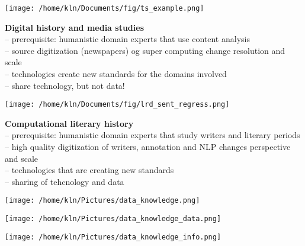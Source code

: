 \documentclass[8pt]{beamer}
\begin{document}

\begin{frame}
	\begin{center}
		\texttt{[image: /home/kln/Documents/fig/ts\_example.png]}
	\end{center}
	\small \textbf{Digital history and media studies}\\
	 -- prerequisite: humanistic domain experts that use content analysis\\
	 -- source digitization (newspapers) og super computing change resolution and scale\\
	 -- technologies create new standards for the domains involved\\
	 -- share technology, but not data!\\
\end{frame}

\begin{frame}
\begin{center}
	\texttt{[image: /home/kln/Documents/fig/lrd\_sent\_regress.png]}
\end{center}
\small \textbf{Computational literary history}\\
	 -- prerequisite: humanistic domain experts that study writers and literary periods\\
	 -- high quality digitization of writers, annotation and NLP changes perspective and scale\\
	 -- technologies that are creating new standards\\
	 -- sharing of tehcnology and data\\
\end{frame}


\begin{frame}{}%
	\begin{center}
		\texttt{[image: /home/kln/Pictures/data\_knowledge.png]}
	\end{center}
\end{frame}
\begin{frame}{}
	\begin{center}
		\texttt{[image: /home/kln/Pictures/data\_knowledge\_data.png]}
	\end{center}
\end{frame}
\begin{frame}{}
	\begin{center}
		\texttt{[image: /home/kln/Pictures/data\_knowledge\_info.png]}
	\end{center}
\end{frame}
\end{document}
